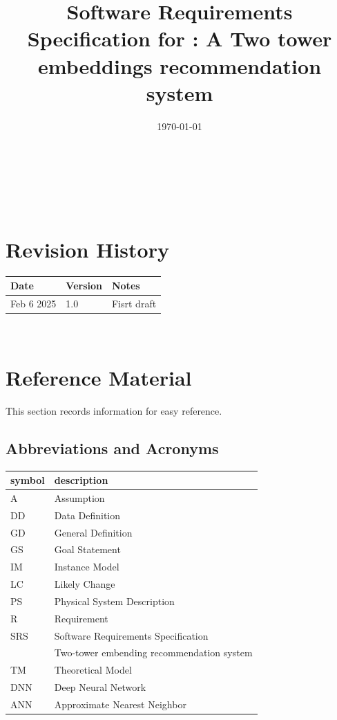 \documentclass[12pt]{article}
\begin{document}
\title{Software Requirements Specification for \progname: A Two tower embeddings recommendation system} 
\author{\authname}
\date{\today}
	
\maketitle

~\newpage


\tableofcontents

~\newpage

\section*{Revision History}

\begin{tabularx}{\textwidth}{p{3cm}p{2cm}X}
\toprule {\bf Date} & {\bf Version} & {\bf Notes}\\
\midrule
Feb 6 2025 & 1.0 & Fisrt draft\\
\bottomrule
\end{tabularx}


~\newpage

\section{Reference Material}

This section records information for easy reference.

\subsection{Abbreviations and Acronyms}

\renewcommand{\arraystretch}{1.2}
\begin{tabular}{l l} 
  \toprule		
  \textbf{symbol} & \textbf{description}\\
  \midrule 
  A & Assumption\\
  DD & Data Definition\\
  GD & General Definition\\
  GS & Goal Statement\\
  IM & Instance Model\\
  LC & Likely Change\\
  PS & Physical System Description\\
  R & Requirement\\
  SRS & Software Requirements Specification\\
  \progname{} & Two-tower embending recommendation system\\
  TM & Theoretical Model\\
  DNN & Deep Neural Network\\
  ANN & Approximate Nearest Neighbor\\
  \bottomrule
\end{tabular}\\
\end{document}
